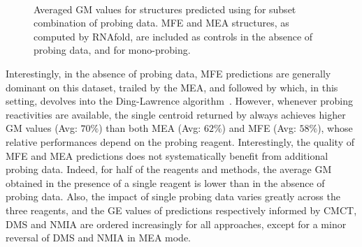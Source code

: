 \documentclass[a4,center,fleqn]{NAR}
\newcommand{\Software}[1]{\text{\ttfamily\bfseries #1}}
\newcommand{\OurTool}{\Software{IPANEMAP}\xspace}
\begin{document}
\begin{figure}
	{\\}
	
	\caption{Averaged GM values for structures  predicted using \OurTool{} for subset combination of probing data. MFE and MEA structures, as computed by RNAfold, are included as controls in the absence of probing data, and for mono-probing.}
	\label{cordero1}
\end{figure}


Interestingly, in the absence of probing data, MFE predictions are generally dominant on this dataset, trailed by the MEA, and followed by \OurTool which, in this setting, devolves into the Ding-Lawrence algorithm~\citep{Ding2003}. However, whenever probing reactivities are available, the single centroid returned by \OurTool always achieves higher GM values (Avg: $70\%$) than both MEA (Avg: $62\%$) and MFE  (Avg: $58\%$), whose relative performances depend on the probing reagent.%
Interestingly, the quality of MFE and MEA predictions does not systematically benefit from additional probing data. Indeed, for half of the reagents and methods, the average GM obtained in the presence of a single reagent is lower than in the absence of probing data. Also, the impact of single probing data varies greatly across the three reagents, and the GE values of predictions respectively informed by CMCT, DMS and NMIA are ordered increasingly for all approaches, except for a minor reversal of DMS and NMIA in MEA mode.
\end{document}
